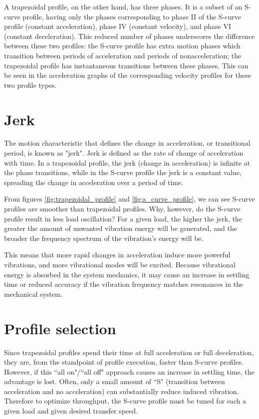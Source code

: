 A trapezoidal profile, on the other hand, has three phases. It is a subset of an
S-curve profile, having only the phases corresponding to phase II of the S-curve
profile (constant acceleration), phase IV (constant velocity), and phase VI
(constant deceleration). This reduced number of phases underscores the
difference between these two profiles: the S-curve profile has extra motion
phases which transition between periods of acceleration and periods of
nonacceleration; the trapezoidal profile has instantaneous transitions between
these phases. This can be seen in the acceleration graphs of the corresponding
velocity profiles for these two profile types.

\section{Jerk}

The motion characteristic that defines the change in acceleration, or
transitional period, is known as "jerk". Jerk is defined as the rate of change
of acceleration with time. In a trapezoidal profile, the jerk (change in
acceleration) is infinite at the phase transitions, while in the S-curve profile
the jerk is a constant value, spreading the change in acceleration over a period
of time.

From figures \ref{fig:trapezoidal_profile} and \ref{fig:s_curve_profile}, we can
see S-curve profiles are smoother than trapezoidal profiles. Why, however, do
the S-curve profile result in less load oscillation? For a given load, the
higher the jerk, the greater the amount of unwanted vibration energy will be
generated, and the broader the frequency spectrum of the vibration's energy will
be.

This means that more rapid changes in acceleration induce more powerful
vibrations, and more vibrational modes will be excited. Because vibrational
energy is absorbed in the system mechanics, it may cause an increase in
\gls{settling time} or reduced accuracy if the vibration frequency matches
resonances in the mechanical system.

\section{Profile selection}

Since trapezoidal profiles spend their time at full acceleration or full
deceleration, they are, from the standpoint of profile execution, faster than
S-curve profiles. However, if this ``all on"/``all off" approach causes an
increase in settling time, the advantage is lost. Often, only a small amount of
``S" (transition between acceleration and no acceleration) can substantially
reduce induced vibration. Therefore to optimize throughput, the S-curve profile
must be tuned for each a given load and given desired transfer speed.

